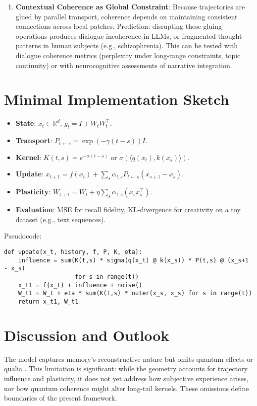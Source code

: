 \documentclass[a4paper,12pt]{article}
\begin{document}
\begin{enumerate}
    \item \textbf{Contextual Coherence as Global Constraint}: 
    Because trajectories are glued by parallel transport, coherence depends on
    maintaining consistent connections across local patches. 
    Prediction: disrupting these gluing operations produces dialogue incoherence
    in LLMs, or fragmented thought patterns in human subjects (e.g., schizophrenia).
    This can be tested with dialogue coherence metrics (perplexity under long-range
    constraints, topic continuity) or with neurocognitive assessments of narrative 
    integration.
\end{enumerate}


\section{Minimal Implementation Sketch}
\begin{itemize}
    \item \textbf{State}: $x_t \in \mathbb{R}^d$, $g_t = I + W_t W_t^\top$.
    \item \textbf{Transport}: $P_{t \leftarrow s} = \exp(-\gamma (t-s)) I$.
    \item \textbf{Kernel}: $K(t,s) = e^{-\alpha (t-s)}$ or $\sigma(\langle q(x_t), k(x_s) \rangle)$.
    \item \textbf{Update}: $x_{t+1} = f(x_t) + \sum_s \alpha_{t,s} P_{t \leftarrow s} (x_{s+1} - x_s)$.
    \item \textbf{Plasticity}: $W_{t+1} = W_t + \eta \sum_s \alpha_{t,s} (x_s x_s^\top)$.
    \item \textbf{Evaluation}: MSE for recall fidelity, KL-divergence for creativity on a toy dataset (e.g., text sequences).
\end{itemize}
Pseudocode:
\begin{verbatim}
def update(x_t, history, f, P, K, eta):
    influence = sum(K(t,s) * sigma(q(x_t) @ k(x_s)) * P(t,s) @ (x_s+1 - x_s) 
                    for s in range(t))
    x_t1 = f(x_t) + influence + noise()
    W_t1 = W_t + eta * sum(K(t,s) * outer(x_s, x_s) for s in range(t))
    return x_t1, W_t1
\end{verbatim}

\section{Discussion and Outlook}
The model captures memory’s reconstructive nature but omits quantum effects or qualia 
\citep{penrose1989road}. This limitation is significant: while the geometry accounts for 
trajectory influence and plasticity, it does not yet address how subjective experience 
arises, nor how quantum coherence might alter long-tail kernels. These omissions define 
boundaries of the present framework.
\end{document}
